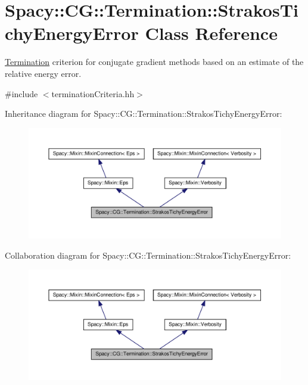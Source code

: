 \hypertarget{classSpacy_1_1CG_1_1Termination_1_1StrakosTichyEnergyError}{\section{\-Spacy\-:\-:\-C\-G\-:\-:\-Termination\-:\-:\-Strakos\-Tichy\-Energy\-Error \-Class \-Reference}
\label{classSpacy_1_1CG_1_1Termination_1_1StrakosTichyEnergyError}
}


\hyperlink{namespaceSpacy_1_1CG_1_1Termination}{\-Termination} criterion for conjugate gradient methods based on an estimate of the relative energy error.  




{\ttfamily \#include $<$termination\-Criteria.\-hh$>$}



\-Inheritance diagram for \-Spacy\-:\-:\-C\-G\-:\-:\-Termination\-:\-:\-Strakos\-Tichy\-Energy\-Error\-:
\nopagebreak
\begin{figure}[H]
\begin{center}
\leavevmode
\includegraphics[width=350pt]{classSpacy_1_1CG_1_1Termination_1_1StrakosTichyEnergyError__inherit__graph}
\end{center}
\end{figure}


\-Collaboration diagram for \-Spacy\-:\-:\-C\-G\-:\-:\-Termination\-:\-:\-Strakos\-Tichy\-Energy\-Error\-:
\nopagebreak
\begin{figure}[H]
\begin{center}
\leavevmode
\includegraphics[width=350pt]{classSpacy_1_1CG_1_1Termination_1_1StrakosTichyEnergyError__coll__graph}
\end{center}
\end{figure}
